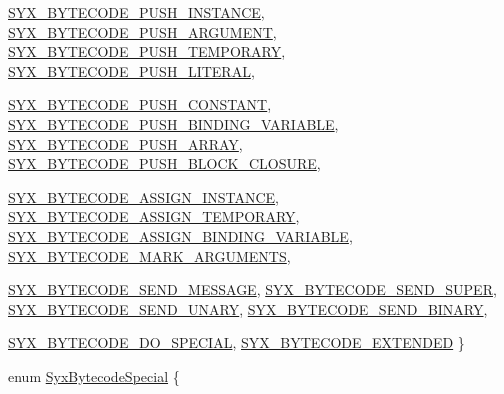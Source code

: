 \begin{CompactItemize}
\hyperlink{syx-enums_8h_d6d0f1ac8587fceead1a94be2bf9648a74456784ab76402e38ae21b19e64c6d1}{SYX\_\-BYTECODE\_\-PUSH\_\-INSTANCE}, 
\hyperlink{syx-enums_8h_d6d0f1ac8587fceead1a94be2bf9648af20fc40b80a818db71f5abacd0559723}{SYX\_\-BYTECODE\_\-PUSH\_\-ARGUMENT}, 
\hyperlink{syx-enums_8h_d6d0f1ac8587fceead1a94be2bf9648a386b56d588c2787cfe0fa8cd88475386}{SYX\_\-BYTECODE\_\-PUSH\_\-TEMPORARY}, 
\hyperlink{syx-enums_8h_d6d0f1ac8587fceead1a94be2bf9648a0be9c6e6d7ded53ece7cb861e3375c0c}{SYX\_\-BYTECODE\_\-PUSH\_\-LITERAL}, 
\par
\hyperlink{syx-enums_8h_d6d0f1ac8587fceead1a94be2bf9648ad0429a0e7719652b3d576f8760d50654}{SYX\_\-BYTECODE\_\-PUSH\_\-CONSTANT}, 
\hyperlink{syx-enums_8h_d6d0f1ac8587fceead1a94be2bf9648a9427e94bb3f62be53104dea249a27746}{SYX\_\-BYTECODE\_\-PUSH\_\-BINDING\_\-VARIABLE}, 
\hyperlink{syx-enums_8h_d6d0f1ac8587fceead1a94be2bf9648a66bf455780214457abc01d1680d57c29}{SYX\_\-BYTECODE\_\-PUSH\_\-ARRAY}, 
\hyperlink{syx-enums_8h_d6d0f1ac8587fceead1a94be2bf9648a4601276c03734c679e2418684b92c98e}{SYX\_\-BYTECODE\_\-PUSH\_\-BLOCK\_\-CLOSURE}, 
\par
\hyperlink{syx-enums_8h_d6d0f1ac8587fceead1a94be2bf9648ad1c97b205f134803f545db74b5cdfe2a}{SYX\_\-BYTECODE\_\-ASSIGN\_\-INSTANCE}, 
\hyperlink{syx-enums_8h_d6d0f1ac8587fceead1a94be2bf9648a15f4ff4c43c048c676988c8e9bbbfe7b}{SYX\_\-BYTECODE\_\-ASSIGN\_\-TEMPORARY}, 
\hyperlink{syx-enums_8h_d6d0f1ac8587fceead1a94be2bf9648a6507ef04b54f1605782a6115c6435657}{SYX\_\-BYTECODE\_\-ASSIGN\_\-BINDING\_\-VARIABLE}, 
\hyperlink{syx-enums_8h_d6d0f1ac8587fceead1a94be2bf9648a2d2ad961e2feae8400817938a5827c7c}{SYX\_\-BYTECODE\_\-MARK\_\-ARGUMENTS}, 
\par
\hyperlink{syx-enums_8h_d6d0f1ac8587fceead1a94be2bf9648aa08406264493f13860cc2aac822e1ae1}{SYX\_\-BYTECODE\_\-SEND\_\-MESSAGE}, 
\hyperlink{syx-enums_8h_d6d0f1ac8587fceead1a94be2bf9648a54e0d5ca2d42aeec438f56d3d2d22e3e}{SYX\_\-BYTECODE\_\-SEND\_\-SUPER}, 
\hyperlink{syx-enums_8h_d6d0f1ac8587fceead1a94be2bf9648ad6c3b34389b3e72788aefa1e37b3f8df}{SYX\_\-BYTECODE\_\-SEND\_\-UNARY}, 
\hyperlink{syx-enums_8h_d6d0f1ac8587fceead1a94be2bf9648a2e5041a512e98ab8f69bd0b54606d7e5}{SYX\_\-BYTECODE\_\-SEND\_\-BINARY}, 
\par
\hyperlink{syx-enums_8h_d6d0f1ac8587fceead1a94be2bf9648aba072baa30afe95e03295faf82dff21a}{SYX\_\-BYTECODE\_\-DO\_\-SPECIAL}, 
\hyperlink{syx-enums_8h_d6d0f1ac8587fceead1a94be2bf9648a8cf90bc409aa8c6feeef4a9b907069fb}{SYX\_\-BYTECODE\_\-EXTENDED}
 \}
\item 
enum \hyperlink{syx-enums_8h_c28bf33befde579fdfc5b282947c25a0}{SyxBytecodeSpecial} \{ \par

\end{CompactItemize}
